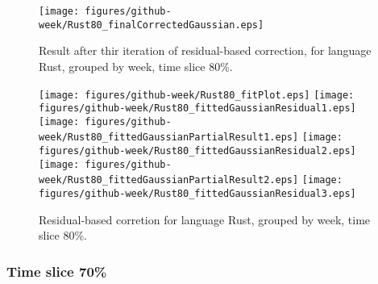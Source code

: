 \begin{figure}[]
\centering
{\texttt{[image: figures/github-week/Rust80\_finalCorrectedGaussian.eps]}}
\caption{Result after thir iteration of residual-based correction, for language Rust, grouped by week, time slice 80\%.}
\end{figure}


\begin{figure}[hb]
\centering
{}
{\texttt{[image: figures/github-week/Rust80\_fitPlot.eps]}}
{\texttt{[image: figures/github-week/Rust80\_fittedGaussianResidual1.eps]}}
{\texttt{[image: figures/github-week/Rust80\_fittedGaussianPartialResult1.eps]}}
{\texttt{[image: figures/github-week/Rust80\_fittedGaussianResidual2.eps]}}
{\texttt{[image: figures/github-week/Rust80\_fittedGaussianPartialResult2.eps]}}
{\texttt{[image: figures/github-week/Rust80\_fittedGaussianResidual3.eps]}}
\caption{Residual-based corretion for language Rust, grouped by week, time slice 80\%.}
\end{figure}


\clearpage 
\newpage 


\FloatBarrier

\subsubsection{Time slice 70\%}

